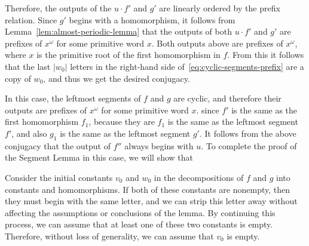 


 
 Therefore, the outputs of the $u \cdot f'$ and $g'$ are linearly ordered by the prefix relation. Since $g'$ begins with a homomorphism, it follows from Lemma~\ref{lem:almost-periodic-lemma} that the outputs of both $u \cdot f'$ and $g'$ are prefixes of $x^\omega$ for some primitive word $x$. 
    Both outputs above are prefixes of $x^\omega$, where $x$ is the primitive root of the first homomorphism in $f$. From this it follows that the last $|w_0|$ letters in the right-hand side of~\eqref{eq:cyclic-segments-prefix} are a copy of $w_0$, and thus we get the desired conjugacy. 


In this case, the leftmost segments of $f$ and $g$ are cyclic, and therefore their outputs are prefixes of $x^\omega$ for some primitive word $x$.  
  since $f'$ is the same as the first homomorphism $f_1$, because they are    $f_1$ is the same as the leftmost segment $f'$, and also $g_1$ is the same as the leftmost segment $g'$. It follows from the above conjugacy that the output of $f''$ always begins with $u$. 
To complete the proof of the Segment Lemma in this case, we will show that 




Consider the initial constants $v_0$ and $w_0$ in the decompositions of $f$ and $g$ into constants and homomorphisms. If both of these constants  are nonempty, then they must begin with the same letter, and we can strip this letter away without affecting the assumptions or conclusions of the lemma. By continuing this process, we can assume that at least one of these two constants is empty. 
Therefore, without loss of generality, we can assume that $v_0$ is empty. 

